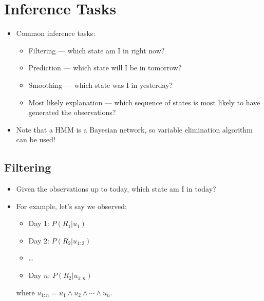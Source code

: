 \documentclass{article}
\begin{document}
\section{Inference Tasks}
\begin{itemize}
    \item Common inference tasks:
        \begin{itemize}
            \item Filtering --- which state am I in right now?
            \item Prediction --- which state will I be in tomorrow?
            \item Smoothing --- which state was I in yesterday?
            \item Most likely explanation --- which sequence of states is most likely to have generated the observations?
        \end{itemize}
    \item Note that a HMM is a Bayesian network, so variable elimination algorithm can be used!
\end{itemize}

\subsection{Filtering}
\begin{itemize}
    \item Given the observations up to today, which state am I in today?
    \item For example, let's say we observed:
        \begin{itemize}
            \item Day 1: $P(R_1|u_1)$
            \item Day 2: $P(R_2|u_{1:2})$
            \item \dots
            \item Day $n$: $P(R_2|u_{1:n})$
        \end{itemize}
        where $u_{1:n} = u_1 \wedge u_2 \wedge \cdots \wedge u_n$.
\end{itemize}
\end{document}
